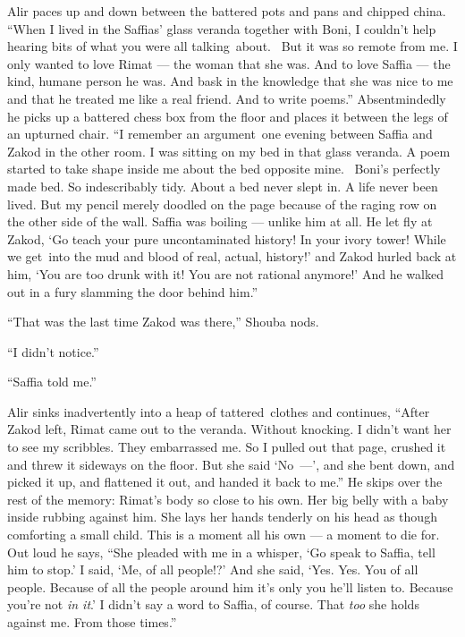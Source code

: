 \documentclass[twoside,11pt]{book}
\begin{document}
Alir paces up and down between the battered pots and pans and chipped china. ``When I lived in the
Saffias{'} glass veranda together with Boni, I couldn't help hearing bits of what you were all talking~about.~ But
it was so remote from me. I only wanted to love Rimat --- the woman that she was. And to love Saffia --- the kind, humane
person he was. And bask in the knowledge that she was nice to me and that he treated me like a real friend. And to
write poems.'' Absentmindedly he picks up a battered chess box from the floor and places it between the
legs of an upturned chair. ``I remember an argument~one evening between Saffia and Zakod in the other
room. I was sitting on my bed in that glass veranda. A poem started to take shape inside me about the bed
opposite mine.~ Boni's perfectly made bed. So indescribably tidy. About a bed never slept in. A life never been
lived. But my pencil merely doodled on the page because of the raging row on the other side of the wall. Saffia was
boiling --- unlike him at all.  He let fly at Zakod, `Go teach your pure uncontaminated history! In your ivory tower!
While we get~into the mud and blood of real, actual, history!' and Zakod hurled back at him, `You are too drunk with
it! You are not rational anymore!{}' And he walked out in a fury slamming the door behind him.''

``That was the last time Zakod was there,'' Shouba nods.

``I didn't notice.''

``Saffia told me.''

Alir sinks inadvertently into a heap of tattered~clothes and continues, ``After Zakod left, Rimat came out
to the veranda. Without knocking. I didn't want her to see my scribbles. They embarrassed me. So I pulled out that
page, crushed it and threw it sideways on the floor.
But she said `No~---', and she bent down, and picked it up, and
flattened it out, and handed it back to me.'' He skips over the rest of the memory: Rimat's body so close
to his own. Her big belly with a baby inside rubbing against him. She lays her hands tenderly on his head as though
comforting a small child.  This is a moment all his own --- a moment to die for. Out loud he says, ``She
pleaded with me in a whisper, `Go speak to Saffia, tell him to stop.' I said, `Me, of all people!?' And she said,
`Yes. Yes. You of all people. Because of all the people around him it's only you he'll listen to. Because you're not
\textit{in it}.' I didn't say a word to Saffia, of course. That \textit{too} she holds against me. From those
times.''
\end{document}
